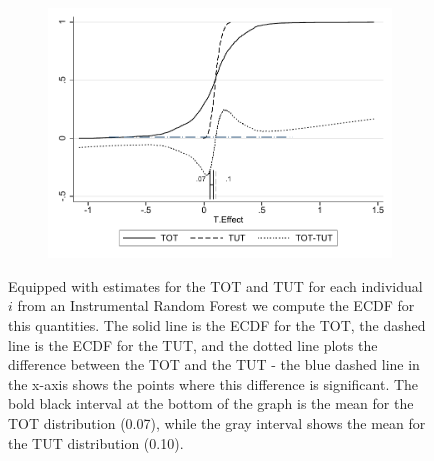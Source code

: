 \documentclass[oneside,11pt]{article}
\begin{document}
\begin{figure}[H]
     \caption{TOT-TUT CDF}
     \label{tot_tut_ecdf}
    \begin{center}
    \begin{subfigure}{0.6\textwidth}
        \centering
        \includegraphics[width=\textwidth]{Figuras/cdf_tot_tut.pdf}
    \end{subfigure}
    \end{center}
    \scriptsize
       Equipped with estimates for the TOT and TUT for each individual $i$ from an Instrumental Random Forest we compute the ECDF for this quantities. The solid line is the ECDF for the TOT, the dashed line is the ECDF for the TUT, and the dotted line plots the difference between the TOT and the TUT - the blue dashed line in the x-axis shows the points where this difference is significant. The bold black interval at the bottom of the graph is the mean for the TOT distribution (0.07), while the gray interval shows the mean for the TUT distribution (0.10).
       
\end{figure}
\end{document}
